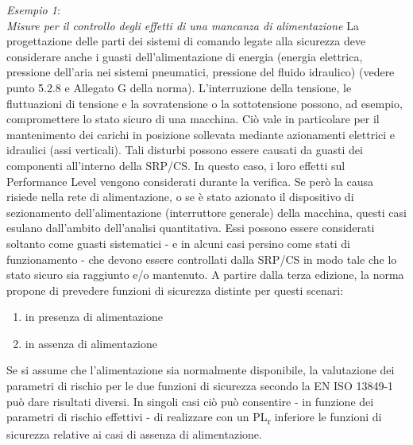\textit{Esempio 1}:\\
\textit{Misure per il controllo degli effetti di una mancanza di alimentazione}
La progettazione delle parti dei sistemi di comando legate alla sicurezza deve considerare anche i guasti dell'alimentazione di energia (energia elettrica, pressione dell'aria nei sistemi pneumatici, pressione del fluido idraulico) (vedere punto 5.2.8 e Allegato G della norma). L'interruzione della tensione, le fluttuazioni di tensione e la sovratensione o la sottotensione possono, ad esempio, compromettere lo stato sicuro di una macchina. Ciò vale in particolare per il mantenimento dei carichi in posizione sollevata mediante azionamenti elettrici e idraulici (assi verticali). Tali disturbi possono essere causati da guasti dei componenti all'interno della SRP/CS. In questo caso, i loro effetti sul Performance Level vengono considerati durante la verifica. Se però la causa risiede nella rete di alimentazione, o se è stato azionato il dispositivo di sezionamento dell'alimentazione (interruttore generale) della macchina, questi casi esulano dall'ambito dell'analisi quantitativa. Essi possono essere considerati soltanto come guasti sistematici - e in alcuni casi persino come stati di funzionamento - che devono essere controllati dalla SRP/CS in modo tale che lo stato sicuro sia raggiunto e/o mantenuto. A partire dalla terza edizione, la norma propone di prevedere funzioni di sicurezza distinte per questi scenari:

\begin{enumerate} [label=\alph*)]
    \item in presenza di alimentazione
    \item in assenza di alimentazione
\end{enumerate}

Se si assume che l'alimentazione sia normalmente disponibile, la valutazione dei parametri di rischio per le due funzioni di sicurezza secondo la EN ISO 13849-1 può dare risultati diversi. In singoli casi ciò può consentire - in funzione dei parametri di rischio effettivi - di realizzare con un PL\textsubscript{r} inferiore le funzioni di sicurezza relative ai casi di assenza di alimentazione.

